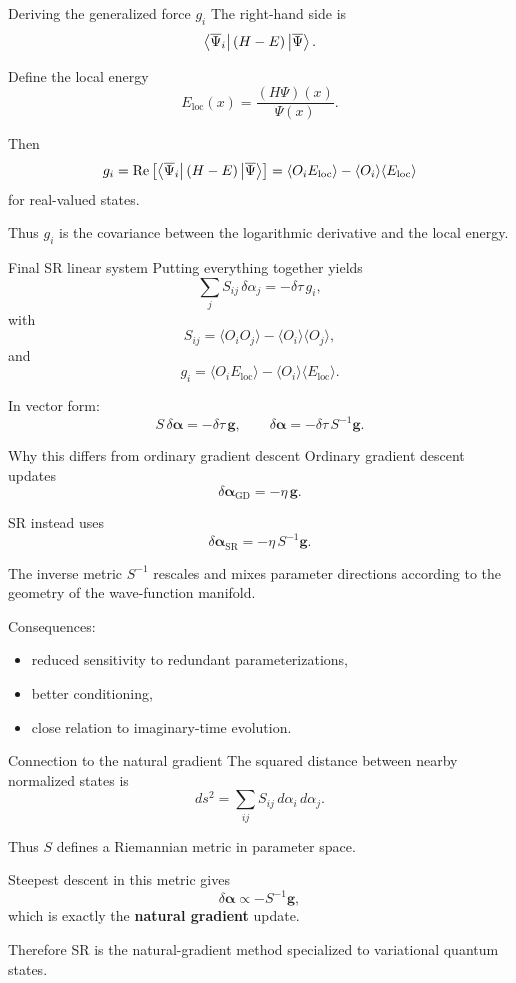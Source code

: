 \documentclass[aspectratio=169]{beamer}
\begin{document}
\begin{frame}{Deriving the generalized force \(g_i\)}
The right-hand side is
\[
\bra{\overline{\Psi}_i}(H-E)\ket{\overline{\Psi}}.
\]

Define the local energy
\[
E_{\mathrm{loc}}(x)=\frac{(H\Psi)(x)}{\Psi(x)}.
\]

Then
\[
g_i
=
\Re\left[
\bra{\overline{\Psi}_i}(H-E)\ket{\overline{\Psi}}
\right]
=
\langle O_i E_{\mathrm{loc}}\rangle
-
\langle O_i\rangle \langle E_{\mathrm{loc}}\rangle
\]
for real-valued states.

Thus \(g_i\) is the covariance between the logarithmic derivative and the local energy.
\end{frame}

\begin{frame}{Final SR linear system}
Putting everything together yields
\[
\sum_j S_{ij}\,\delta\alpha_j = -\delta\tau\, g_i,
\]
with
\[
S_{ij}
=
\langle O_i O_j\rangle
-
\langle O_i\rangle \langle O_j\rangle,
\]
and
\[
g_i
=
\langle O_i E_{\mathrm{loc}}\rangle
-
\langle O_i\rangle \langle E_{\mathrm{loc}}\rangle.
\]

In vector form:
\[
S\,\delta\bm{\alpha} = -\delta\tau\, \bm{g},
\qquad
\delta\bm{\alpha} = -\delta\tau\, S^{-1}\bm{g}.
\]
\end{frame}

\begin{frame}{Why this differs from ordinary gradient descent}
Ordinary gradient descent updates
\[
\delta\bm{\alpha}_{\mathrm{GD}} = -\eta \,\bm{g}.
\]

SR instead uses
\[
\delta\bm{\alpha}_{\mathrm{SR}} = -\eta \, S^{-1}\bm{g}.
\]

The inverse metric \(S^{-1}\) rescales and mixes parameter directions according to the geometry of the wave-function manifold.

\medskip

Consequences:
\begin{itemize}
\item reduced sensitivity to redundant parameterizations,
\item better conditioning,
\item close relation to imaginary-time evolution.
\end{itemize}
\end{frame}

\begin{frame}{Connection to the natural gradient}
The squared distance between nearby normalized states is
\[
ds^2
=
\sum_{ij} S_{ij}\, d\alpha_i\, d\alpha_j.
\]

Thus \(S\) defines a Riemannian metric in parameter space.

\medskip

Steepest descent in this metric gives
\[
\delta\bm{\alpha} \propto -S^{-1}\bm{g},
\]
which is exactly the \textbf{natural gradient} update.

Therefore SR is the natural-gradient method specialized to variational quantum states.
\end{frame}
\end{document}
